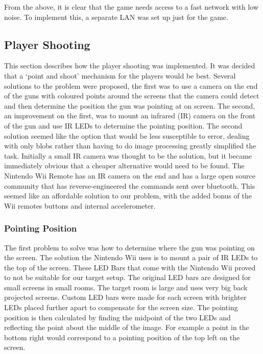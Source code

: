 \documentclass[a4paper,11pt]{article}
\begin{document}
From the above, it is clear that the game needs access to a fast network with low noise. To implement this, a separate LAN was set up just for the game.


\subsection{Player Shooting}
This section describes how the player shooting was implemented. It was decided that a ‘point and shoot’ mechanism for the players would be best. Several solutions to the problem were proposed, the first was to use a camera on the end of the guns with coloured points around the screens that the camera could detect and then determine the position the gun was pointing at on screen. The second, an improvement on the first, was to mount an infrared (IR) camera on the front of the gun and use IR LEDs to determine the pointing position. 
The second solution seemed like the option that would be less susceptible to error, dealing with only blobs rather than having to do image processing greatly simplified the task. Initially a small IR camera was thought to be the solution, but it became immediately obvious that a cheaper alternative would need to be found. The Nintendo Wii Remote\cite{wiibrew_wiimote} has an IR camera on the end and has a large open source community that has reverse-engineered the commands sent over bluetooth. This seemed like an affordable solution to our problem, with the added bonus of the Wii remotes buttons and internal accelerometer. 

\subsubsection{Pointing Position}
The first problem to solve was how to determine where the gun was pointing on the screen. The solution the Nintendo Wii uses is to mount a pair of IR LEDs to the top of the screen. These LED Bars that come with the Nintendo Wii proved to not be suitable for our target setup. The original LED bars are designed for small screens in small rooms. The target room is large and uses very big back projected screens. Custom LED bars were made for each screen with brighter LEDs placed further apart to compensate for the screen size. The pointing position is then calculated by finding the midpoint of the two LEDs and reflecting the point about the middle of the image. For example a point in the bottom right would correspond to a pointing position of the top left on the screen. 
\end{document}

